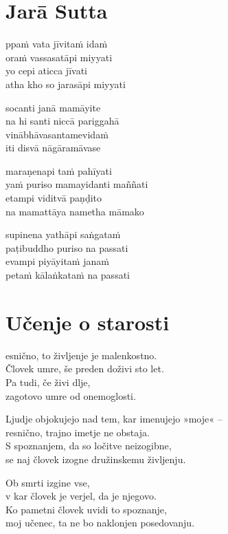 

\cleartoverso
\chapter*{Jarā Sutta}

ppaṁ vata jīvitaṁ idaṁ\\
oraṁ vassasatāpi miyyati\\
yo cepi aticca jīvati\\
atha kho so jarasāpi miyyati

socanti janā mamāyite\\
na hi santi niccā pariggahā\\
vinābhāvasantamevidaṁ\\
iti disvā nāgāramāvase

maraṇenapi taṁ pahīyati\\
yaṁ puriso mamayidanti maññati\\
etampi viditvā paṇḍito\\
na mamattāya nametha māmako

supinena yathāpi saṅgataṁ\\
paṭibuddho puriso na passati\\
evampi piyāyitaṁ janaṁ\\
petaṁ kālaṅkataṁ na passati


\cleartorecto
\chapter{Učenje o starosti}

esnično, to življenje je malenkostno.\\
Človek umre, še preden doživi sto let.\\
Pa tudi, če živi dlje,\\
zagotovo umre od onemoglosti.

Ljudje objokujejo nad tem, kar imenujejo »moje« --\\
resnično, trajno imetje ne obstaja.\\
S spoznanjem, da so ločitve neizogibne,\\
se naj človek izogne družinskemu življenju.

Ob smrti izgine vse,\\
v kar človek je verjel, da je njegovo.\\
Ko pametni človek uvidi to spoznanje,\\
moj učenec, ta ne bo naklonjen posedovanju.

